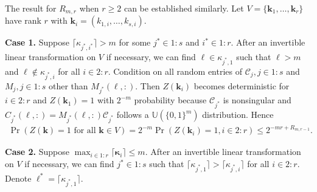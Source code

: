 \documentclass{article}
\theoremstyle{definition}
\renewcommand{\leq}{\leqslant}
\renewcommand{\geq}{\geqslant}
\newcommand{\bsk}{\boldsymbol{k}}
\newcommand{\bskappa}{\boldsymbol{\kappa}}
\newcommand{\dunif}{\mathbb{U}}
\begin{document}
The result for $R_{m,r}$ when $r\geq 2$ can be established similarly. Let $V=\{\bsk_1,\dots,\bsk_r\}$ have rank $r$ with $\bsk_i=(k_{1,i},\dots,k_{s,i})$.

\textbf{Case 1.} Suppose $\lceil\kappa_{j^*,i^*}\rceil>m$ for some $j^*\in 1{:}s$ and $i^*\in 1{:}r$. After an invertible linear transformation on $V$ if necessary, we can find $\ell\in \kappa_{j^*,1}$ such that $\ell>m$ and $\ell\notin \kappa_{j^*,i}$ for all $i\in 2{:}r$. Condition on all random entries of $\mathcal{C}_j,j\in 1{:}s$ and $M_j, j\in 1{:}s$ other than $M_{j^*}(\ell,:)$. Then $Z(\bsk_{i})$ becomes deterministic for $i\in 2{:}r$ and $Z(\bsk_1)=1$ with $2^{-m}$ probability because $\mathcal{C}_{j^*}$ is nonsingular and $C_{j^*}(\ell,:)=M_{j^*}(\ell,:)\mathcal{C}_{j^*}$ follows a $\dunif(\{0,1\}^m)$ distribution. Hence 
\begin{align}\label{eqn:ZkVbound}
    \Pr(Z(\bsk)=1 \text{ for all }\bsk\in V)=2^{-m}\Pr(Z(\bsk_i)=1, i\in 2{:}r )\leq 2^{-mr+R_{m,r-1}}.
\end{align}

\textbf{Case 2.} Suppose $\max_{i\in 1{:}r}\lceil\bskappa_{i}\rceil\leq m$. After an invertible linear transformation on $V$ if necessary, we can find $j^*\in 1{:}s$ such that $\lceil\kappa_{j^*,1}\rceil>\lceil\kappa_{j^*,i}\rceil$ for all $i\in 2{:}r$. Denote $\ell^*=\lceil\kappa_{j^*,1}\rceil$. 
\end{document}
